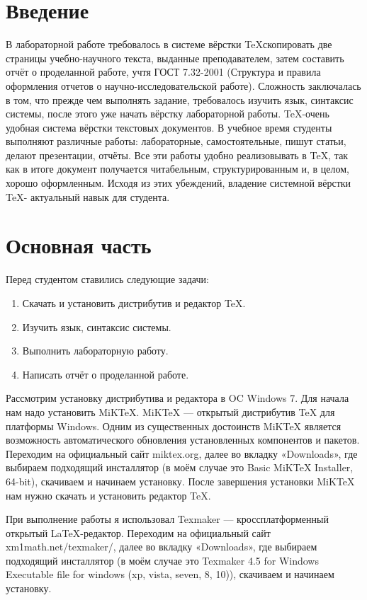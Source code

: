 \documentclass[a4paper,12pt]{article}
\renewcommand\contentsname{Содержание}
\begin{document}
\newpage
\renewcommand\contentsname{Содержание} 
\tableofcontents
\setcounter{page}{3}

\newpage

\section{Введение}

 В лабораторной работе требовалось в системе вёрстки \TeX скопировать две страницы учебно-научного текста, выданные преподавателем, затем составить отчёт о проделанной работе, учтя ГОСТ 7.32-2001 (Структура и правила оформления отчетов о научно-ис\-сле\-до\-ва\-тель\-ской работе). Сложность заключалась в том, что прежде чем выполнять задание, требовалось изучить язык, синтаксис системы, после этого уже начать вёрстку лабораторной работы. \TeX -очень удобная система вёрстки текстовых документов. В учебное время студенты выполняют различные работы: лабораторные, самостоятельные, пишут статьи, делают презентации, отчёты. Все эти работы удобно реализовывать в \TeX, так как в итоге документ получается читабельным, структурированным и, в целом, хорошо оформленным. Исходя из этих убеждений, владение системной вёрстки \TeX - актуальный навык для студента.

\section{Основная часть}
   Перед студентом ставились следующие задачи:
\begin{enumerate}
\item Скачать и установить дистрибутив и редактор \TeX.
\item Изучить язык, синтаксис системы.
\item Выполнить лабораторную работу.
\item Написать отчёт о проделанной работе.
\end{enumerate}
Рассмотрим установку дистрибутива и редактора в OC Windows 7. Для начала нам надо установить MiKTeX. MiKTeX — открытый дистрибутив TeX для платформы Windows. Одним из существенных достоинств MiKTeX является возможность автоматического об\-но\-вле\-ния установленных компонентов и пакетов. Переходим на официальный сайт miktex.org, далее во вкладку «Downloads», где выбираем подходящий инсталлятор (в моём случае это Basic MiKTeX Installer, 64-bit), скачиваем и начинаем установку. После завершения установки MiKTeX нам нужно скачать и установить редактор \TeX. 

При выполнение работы я использовал Texmaker — кроссплатформенный открытый LaTeX-редактор. Переходим на официальный сайт xm1math.net/texmaker/, далее во вкладку «Downloads», где выбираем подходящий инсталлятор (в моём случае это Texmaker 4.5 for Windows Executable file for windows (xp, vista, seven, 8, 10)), скачиваем и начинаем установку. 
    
\end{document}
